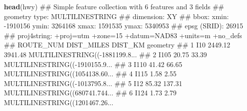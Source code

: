 \documentclass[11pt,ignorenonframetext,]{beamer}
\newenvironment{Shaded}{}{}
\newcommand{\KeywordTok}[1]{\textcolor[rgb]{0.00,0.44,0.13}{\textbf{#1}}}
\newcommand{\NormalTok}[1]{#1}
\let\oldShaded\Shaded
\let\endoldShaded\endShaded
\renewenvironment{Shaded}{\footnotesize\begin{spacing}{0.9}\oldShaded}{\endoldShaded\end{spacing}}
\let\oldverbatim\verbatim
\let\endoldverbatim\endverbatim
\newcommand{\tinyoutput}{
  \renewenvironment{Shaded}{\tiny\begin{spacing}{0.9}\oldShaded}{\endoldShaded\end{spacing}}
  \renewenvironment{verbatim}{\tiny\begin{spacing}{0.9}\oldverbatim}{\endoldverbatim\end{spacing}}
}
\begin{document}
\begin{frame}[fragile,t]{}

\tinyoutput

\begin{Shaded}
\begin{Highlighting}[]
\KeywordTok{head}\NormalTok{(hwy)}
\NormalTok{## Simple feature collection with 6 features and 3 fields}
\NormalTok{## geometry type:  MULTILINESTRING}
\NormalTok{## dimension:      XY}
\NormalTok{## bbox:           xmin: -1910156 ymin: 3264168 xmax: 1591535 ymax: 5340953}
\NormalTok{## epsg (SRID):    26915}
\NormalTok{## proj4string:    +proj=utm +zone=15 +datum=NAD83 +units=m +no_defs}
\NormalTok{##   ROUTE_NUM DIST_MILES DIST_KM                       geometry}
\NormalTok{## 1       I10    2449.12 3941.48 MULTILINESTRING((-1881199.8...}
\NormalTok{## 2      I105      20.75   33.39 MULTILINESTRING((-1910155.9...}
\NormalTok{## 3      I110      41.42   66.65 MULTILINESTRING((1054138.60...}
\NormalTok{## 4      I115       1.58    2.55 MULTILINESTRING((-1013795.8...}
\NormalTok{## 5       I12      85.32  137.31 MULTILINESTRING((680741.744...}
\NormalTok{## 6      I124       1.73    2.79 MULTILINESTRING((1201467.26...}
\end{Highlighting}
\end{Shaded}

\end{frame}
\end{document}
